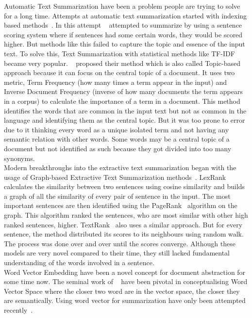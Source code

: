 Automatic Text Summarization have been a problem people are trying to solve for a long time.
Attempts at automatic text summarization started with indexing based methods~\cite{Baxendale_1958_firstsummarization}.
In this attempt \citeauthor{Baxendale_1958_firstsummarization}~\cite{Baxendale_1958_firstsummarization} attempted to
summarize by using a sentence scoring system where if sentences had some certain words, they would be scored higher.
But methods like this failed to capture the topic and essence of the input text.
To solve this, Text Summarization with statistical methods like TF-IDF became very popular.
\citeauthor{edmundson_1969_earlysum}~\cite{edmundson_1969_earlysum} proposed their method which is also called
Topic-based approach because it can focus on the central topic of a document.
It uses two metric, Term Frequency (how many times a term appear in the input) and Inverse Document Frequency
(inverse of how many documents the term appears in a corpus) to calculate the importance of a term in a document.
This method identifies the words that are common in the input text but not as common in the language and identifying
them as the central topic.
But it was too prone to error due to it thinking every word as a unique isolated term and not having
any semantic relation with other words.
Some words may be a central topic of a document but not identified as such because they got divided into too many
synonyms. \\

Modern breakthroughs into the extractive text summarization began with the usage of Graph-based Extractive
Text Summarization methods~\cite{Erkan-lexRank-2004, mihalcea-2004-textrank}.
LexRank~\cite{Erkan-lexRank-2004} calculates the similarity between two sentences using cosine similarity and builds a graph
of all the similarity of every pair of sentence in the input.
The most important sentences are then identified using the PageRank~\cite{page-PageRank-1999} algorithm on the graph.
This algorithm ranked the sentences, who are most similar with other high ranked sentences, higher.
TextRank~\cite{mihalcea-2004-textrank} also uses a similar approach.
But for every sentence, the method distributed its scores to its neighbours using random walk.
The process was done over and over until the scores converge.
Although these models are very novel compared to their time, they still lacked fundamental understanding of the
words involved in a sentence.\\

Word Vector Embedding have been a novel concept for document abstraction for some time now.
The seminal work of \citeauthor{salton-1975-word-vector}~\cite{salton-1975-word-vector} have been pivotal in
conceptualising Word Vector Space where the closer two word are in the vector space, the closer they are semantically.
Using word vector for summarization have only been attempted recently~\cite{Jain-2017-word-vector-embedding-summary}.\\

